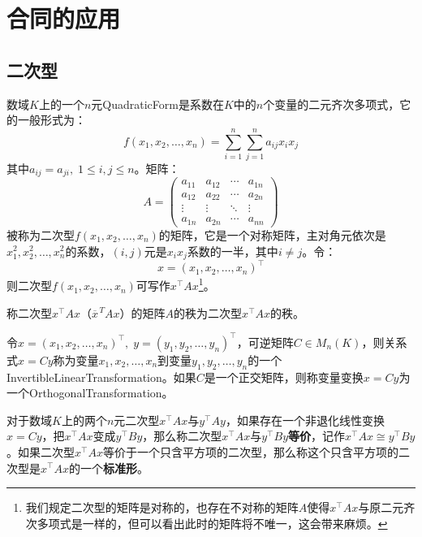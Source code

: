 \section{合同的应用}
\subsection{二次型}
\begin{definition}
	数域$K$上的一个$n$元\gls{QuadraticForm}是系数在$K$中的$n$个变量的二元齐次多项式，它的一般形式为：
	\begin{equation*}
		f(x_1,x_2,\dots,x_n)=\sum_{i=1}^{n}\sum_{j=1}^{n}a_{ij}x_ix_j
	\end{equation*}
	其中$a_{ij}=a_{ji},\;1\leqslant i,j\leqslant n$。矩阵：
	\begin{equation*}
		A=
		\begin{pmatrix}
			a_{11} & a_{12} & \cdots & a_{1n} \\
			a_{12} & a_{22} & \cdots & a_{2n} \\
			\vdots & \vdots & \ddots & \vdots \\
			a_{1n} & a_{2n} & \cdots & a_{nn}
		\end{pmatrix}
	\end{equation*}
	被称为二次型$f(x_1,x_2,\dots,x_n)$的矩阵，它是一个对称矩阵，主对角元依次是$x_1^2,x_2^2,\dots,x_n^2$的系数，$(i,j)$元是$x_ix_j$系数的一半，其中$i\ne j$。令：
	\begin{equation*}
		x=(x_1,x_2,\dots,x_n)^{\top}
	\end{equation*}
	则二次型$f(x_1,x_2,\dots,x_n)$可写作$x^{\top}Ax$\footnote{我们规定二次型的矩阵是对称的，也存在不对称的矩阵$A$使得$x^{\top}Ax$与原二元齐次多项式是一样的，但可以看出此时的矩阵将不唯一，这会带来麻烦。}。
\end{definition}
\begin{definition}
	称二次型$x^{\top}Ax$（$\overline{x}^{\,T}Ax$）的矩阵$A$的秩为二次型$x^{\top}Ax$的秩。
\end{definition}
\begin{definition}
	令$x=(x_1,x_2,\dots,x_n)^{\top},\;y=(y_1,y_2,\dots,y_n)^{\top}$，可逆矩阵$C\in M_{n}(K)$，则关系式$x=Cy$称为变量$x_1,x_2,\dots,x_n$到变量$y_1,y_2,\dots,y_n$的一个\gls{InvertibleLinearTransformation}。如果$C$是一个正交矩阵，则称变量变换$x=Cy$为一个\gls{OrthogonalTransformation}。
\end{definition}
\begin{definition}
	对于数域$K$上的两个$n$元二次型$x^{\top}Ax$与$y^{\top}Ay$，如果存在一个非退化线性变换$x=Cy$，把$x^{\top}Ax$变成$y^{\top}By$，那么称二次型$x^{\top}Ax$与$y^{\top}By$\textbf{等价}，记作$x^{\top}Ax\cong y^{\top}By$。如果二次型$x^{\top}Ax$等价于一个只含平方项的二次型，那么称这个只含平方项的二次型是$x^{\top}Ax$的一个\textbf{标准形}。
\end{definition}
